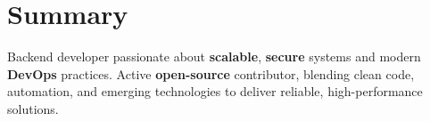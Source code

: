 \section{Summary}

\begin{onecolentry}
	Backend developer passionate about \textbf{scalable}, \textbf{secure} systems and modern
	\textbf{DevOps} practices. Active \textbf{open-source} contributor, blending clean code, automation, and
	emerging technologies to deliver reliable, high-performance solutions.
\end{onecolentry}
